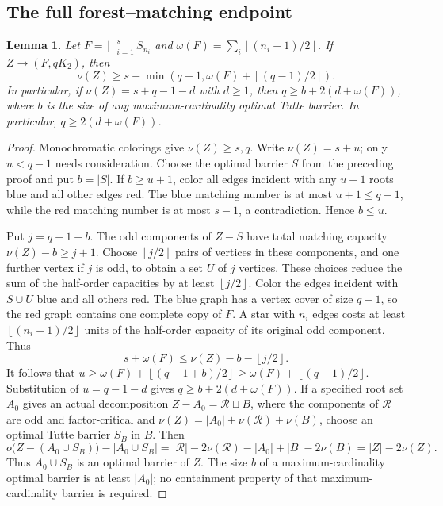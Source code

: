\documentclass[11pt,a4paper]{article}
\newcommand{\sq}{\bigsqcup}
\newcommand{\floor}[1]{\left\lfloor#1\right\rfloor}
\newtheorem{lemma}[theorem]{Lemma}
\theoremstyle{definition}
\begin{document}
\subsection{The full forest--matching endpoint}
\begin{lemma}\label{lem:strong-endpoint}
Let $F=\sq_{i=1}^s S_{n_i}$ and $\omega(F)=\sum_i\floor{(n_i-1)/2}$. If $Z\to(F,qK_2)$, then
\[
 \nu(Z)\ge s+\min\left(q-1,\omega(F)+\floor{(q-1)/2}\right).
\]
In particular, if $\nu(Z)=s+q-1-d$ with $d\ge1$, then $q\ge b+2(d+\omega(F))$, where $b$ is the size of any maximum-cardinality optimal Tutte barrier. In particular, $q\ge2(d+\omega(F))$.
\end{lemma}
\begin{proof}
Monochromatic colorings give $\nu(Z)\ge s,q$. Write $\nu(Z)=s+u$; only $u<q-1$ needs consideration. Choose the optimal barrier $S$ from the preceding proof and put $b=|S|$. If $b\ge u+1$, color all edges incident with any $u+1$ roots blue and all other edges red. The blue matching number is at most $u+1\le q-1$, while the red matching number is at most $s-1$, a contradiction. Hence $b\le u$.

Put $j=q-1-b$. The odd components of $Z-S$ have total matching capacity $\nu(Z)-b\ge j+1$. Choose $\floor{j/2}$ pairs of vertices in these components, and one further vertex if $j$ is odd, to obtain a set $U$ of $j$ vertices. These choices reduce the sum of the half-order capacities by at least $\floor{j/2}$. Color the edges incident with $S\cup U$ blue and all others red. The blue graph has a vertex cover of size $q-1$, so the red graph contains one complete copy of $F$. A star with $n_i$ edges costs at least $\floor{(n_i+1)/2}$ units of the half-order capacity of its original odd component. Thus
\[
 s+\omega(F)\le\nu(Z)-b-\floor{j/2}.
\]
It follows that $u\ge\omega(F)+\floor{(q-1+b)/2}\ge\omega(F)+\floor{(q-1)/2}$. Substitution of $u=q-1-d$ gives $q\ge b+2(d+\omega(F))$. If a specified root set $A_0$ gives an actual decomposition
$Z-A_0=\mathcal R\sqcup B$, where the components of $\mathcal R$ are odd
and factor-critical and
$\nu(Z)=|A_0|+\nu(\mathcal R)+\nu(B)$, choose an optimal Tutte barrier
$S_B$ in $B$. Then
\[
 o\bigl(Z-(A_0\cup S_B)\bigr)-|A_0\cup S_B|
 =|\mathcal R|-2\nu(\mathcal R)-|A_0|+|B|-2\nu(B)
 =|Z|-2\nu(Z).
\]
Thus $A_0\cup S_B$ is an optimal barrier of $Z$. The size $b$ of a
maximum-cardinality optimal barrier is at least $|A_0|$; no containment
property of that maximum-cardinality barrier is required.
\end{proof}
\end{document}
